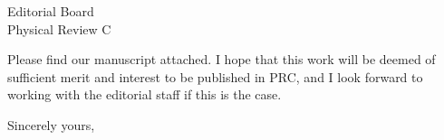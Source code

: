 \documentclass{letter} %
\begin{document}
\begin{letter}{
Editorial Board \\
Physical Review C}




Please find our manuscript attached.  I hope that this work will be deemed of sufficient merit and interest to be published in PRC, and I look forward to working with the editorial staff if this is the case. 
 
\closing{Sincerely yours,} 
 
 

\end{letter}
 
\end{document}
